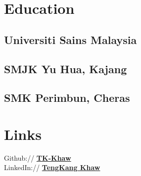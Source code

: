 \documentclass[letterpaper]{deedy-resume} %
\begin{document}
\begin{minipage}[t]{0.33\textwidth} %


\section{Education} 

\subsection{Universiti Sains Malaysia}
\sectionspace %


\subsection{SMJK Yu Hua, Kajang}
\sectionspace %

\subsection{SMK Perimbun, Cheras}
\sectionspace



\section{Links} 

Github:// \href{https://github.com/TK-Khaw}{\bf TK-Khaw} \\
LinkedIn:// \href{https://www.linkedin.com/in/teng-kang-khaw-326657132/}{\bf TengKang Khaw} \\

\sectionspace %


\sectionspace %



\end{minipage}
\end{document}
